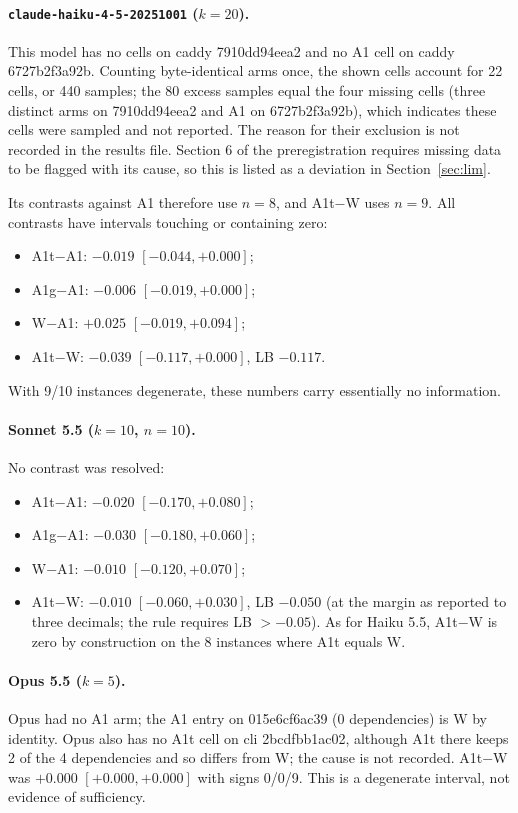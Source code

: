 \paragraph{\texttt{claude-haiku-4-5-20251001} ($k=20$).} This model has no cells on caddy 7910dd94eea2 and no A1 cell on caddy 6727b2f3a92b. Counting byte-identical arms once, the shown cells account for 22 cells, or 440 samples; the 80 excess samples equal the four missing cells (three distinct arms on 7910dd94eea2 and A1 on 6727b2f3a92b), which indicates these cells were sampled and not reported. The reason for their exclusion is not recorded in the results file. Section 6 of the preregistration requires missing data to be flagged with its cause, so this is listed as a deviation in Section~\ref{sec:lim}.

Its contrasts against A1 therefore use $n=8$, and A1t$-$W uses $n=9$. All contrasts have intervals touching or containing zero:
\begin{itemize}
\item A1t$-$A1: $-0.019$ $[-0.044, +0.000]$;
\item A1g$-$A1: $-0.006$ $[-0.019, +0.000]$;
\item W$-$A1: $+0.025$ $[-0.019, +0.094]$;
\item A1t$-$W: $-0.039$ $[-0.117, +0.000]$, LB $-0.117$.
\end{itemize}
With 9/10 instances degenerate, these numbers carry essentially no information.

\paragraph{Sonnet 5.5 ($k=10$, $n=10$).} No contrast was resolved:
\begin{itemize}
\item A1t$-$A1: $-0.020$ $[-0.170, +0.080]$;
\item A1g$-$A1: $-0.030$ $[-0.180, +0.060]$;
\item W$-$A1: $-0.010$ $[-0.120, +0.070]$;
\item A1t$-$W: $-0.010$ $[-0.060, +0.030]$, LB $-0.050$ (at the margin as reported to three decimals; the rule requires LB $> -0.05$). As for Haiku 5.5, A1t$-$W is zero by construction on the 8 instances where A1t equals W.
\end{itemize}

\paragraph{Opus 5.5 ($k=5$).} Opus had no A1 arm; the A1 entry on 015e6cf6ac39 (0 dependencies) is W by identity. Opus also has no A1t cell on cli 2bcdfbb1ac02, although A1t there keeps 2 of the 4 dependencies and so differs from W; the cause is not recorded. A1t$-$W was $+0.000$ $[+0.000, +0.000]$ with signs 0/0/9. This is a degenerate interval, not evidence of sufficiency.

